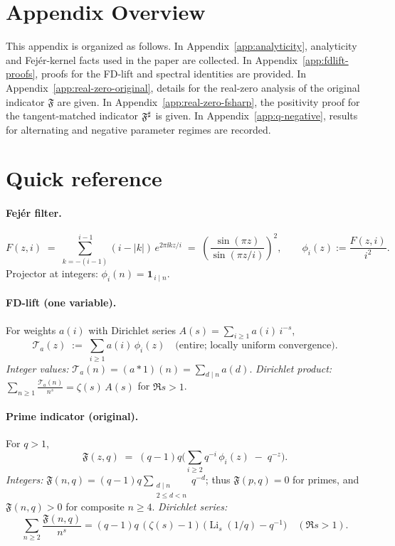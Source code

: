 \appendix

\section*{Appendix Overview}
This appendix is organized as follows. In Appendix~\ref{app:analyticity}, analyticity and Fej\'er-kernel facts used in the paper are collected. In Appendix~\ref{app:fdlift-proofs}, proofs for the FD-lift and spectral identities are provided. In Appendix~\ref{app:real-zero-original}, details for the real-zero analysis of the original indicator $\mathfrak F$ are given. In Appendix~\ref{app:real-zero-fsharp}, the positivity proof for the tangent-matched indicator $\mathfrak F^{\sharp}$ is given. In Appendix~\ref{app:q-negative}, results for alternating and negative parameter regimes are recorded.


\section{Quick reference}\label{app:quickref}

\paragraph{Fej\'er filter.}
\[
F(z,i)\;=\;\sum_{k=-(i-1)}^{\,i-1}(i-|k|)\,e^{2\pi\ii k z/i}
\;=\;\left(\frac{\sin(\pi z)}{\sin(\pi z/i)}\right)^{\!2},
\qquad
\phi_i(z):=\frac{F(z,i)}{i^{2}}.
\]
Projector at integers: \(\phi_i(n)=\mathbf 1_{\,i\mid n}\).

\paragraph{FD-lift (one variable).}
For weights \(a(i)\) with Dirichlet series \(A(s)=\sum_{i\ge1}a(i)\,i^{-s}\),
\[
\mathcal T_a(z)\;:=\;\sum_{i\ge1} a(i)\,\phi_i(z)
\quad\text{(entire; locally uniform convergence)}.
\]
\textit{Integer values:} \(\mathcal T_a(n)=(a*1)(n)=\sum_{d\mid n}a(d)\).
\quad
\textit{Dirichlet product:} \(\displaystyle \sum_{n\ge1}\frac{\mathcal T_a(n)}{n^s}=\zeta(s)\,A(s)\) for \(\Re s>1\).

\paragraph{Prime indicator (original).}
For \(q>1\),
\[
\mathfrak F(z,q)\;=\;(q-1)q\Big(\sum_{i\ge2} q^{-i}\,\phi_i(z)\;-\;q^{-z}\Big).
\]
\textit{Integers:} \(\displaystyle \mathfrak F(n,q)=(q-1)q\!\!\sum_{\substack{d\mid n\\2\le d<n}} q^{-d}\);
thus \(\mathfrak F(p,q)=0\) for primes, and \(\mathfrak F(n,q)>0\) for composite \(n\ge4\).
\textit{Dirichlet series:}
\[
\sum_{n\ge2}\frac{\mathfrak F(n,q)}{n^{s}}
=(q-1)q\,(\zeta(s)-1)\,\bigl(\operatorname{Li}_{s}(1/q)-q^{-1}\bigr)\quad(\Re s>1).
\]

